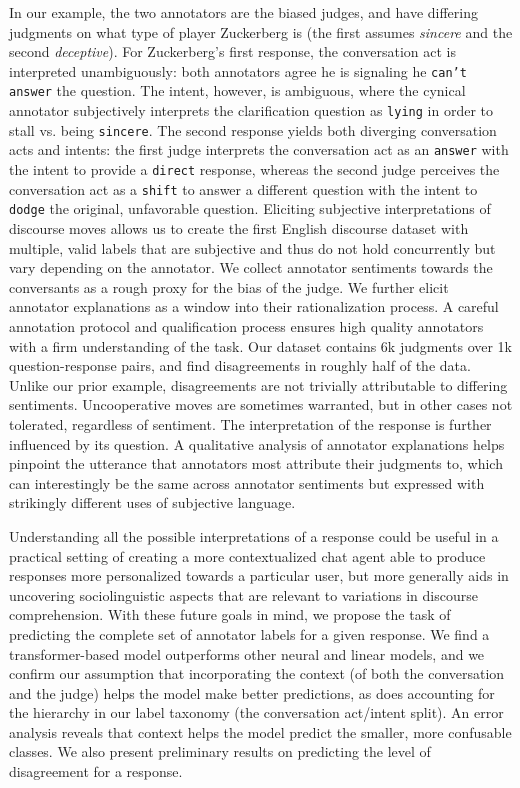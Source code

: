 In our example, the two annotators are the biased judges, and have differing judgments on what type of player Zuckerberg is (the first assumes \emph{sincere} and the second \emph{deceptive}). For Zuckerberg's first response, the conversation act is interpreted unambiguously: both annotators agree he is signaling he \texttt{can't answer} the question. The intent, however, is ambiguous, where the cynical annotator subjectively interprets the clarification question as \texttt{lying} in order to stall vs. being \texttt{sincere}. The second response yields both diverging conversation acts and intents: the first judge interprets the conversation act as an \texttt{answer} with the intent to provide a \texttt{direct} response, whereas the second judge perceives the conversation act as a \texttt{shift} to answer a different question with the intent to \texttt{dodge} the original, unfavorable question. Eliciting subjective interpretations of discourse moves allows us to create the first English discourse dataset with multiple, valid labels that are subjective and thus do not hold concurrently but vary depending on the annotator. We collect annotator sentiments towards the conversants as a rough proxy for the bias of the judge. We further elicit annotator explanations as a window into their rationalization process. A careful annotation protocol and qualification process ensures high quality annotators with a firm understanding of the task. Our dataset contains 6k judgments over 1k question-response pairs, and find disagreements in roughly half of the data. Unlike our prior example, disagreements are not trivially attributable to differing sentiments. Uncooperative moves are sometimes warranted, but in other cases not tolerated, regardless of sentiment. The interpretation of the response is further influenced by its question. A qualitative analysis of annotator explanations helps pinpoint the utterance that annotators most attribute their judgments to, which can interestingly be the same across annotator sentiments but expressed with strikingly different uses of subjective language.


Understanding all the possible interpretations of a response could be useful in a practical setting of creating a more contextualized chat agent able to produce responses more personalized towards a particular user, but more generally aids in uncovering sociolinguistic aspects that are relevant to variations in discourse comprehension. With these future goals in mind, we propose the task of predicting the complete set of annotator labels for a given response. We find a transformer-based model outperforms other neural and linear models, and we confirm our assumption that incorporating the context (of both the conversation and the judge) helps the model make better predictions, as does accounting for the hierarchy in our label taxonomy (the conversation act/intent split). An error analysis reveals that context helps the model predict the smaller, more confusable classes. We also present preliminary results on predicting the level of disagreement for a response.

